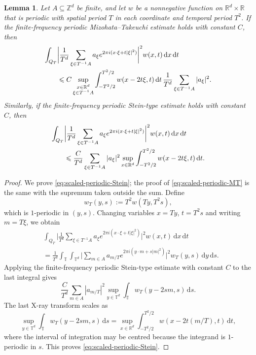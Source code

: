 \documentclass[10pt,a4paper]{amsart}
\newtheorem{lemma}[theorem]{Lemma}
\numberwithin{equation}{section}
\newcommand{\dd}{\,\mathrm{d}}
\renewcommand{\leq}{\leqslant}
\begin{document}
\begin{lemma}
Let $A\subseteq\mathbb{Z}^d$ be finite, and let $w$ be a nonnegative function on $\mathbb{R}^d\times\mathbb{R}$ that is periodic with spatial period $T$ in each coordinate and temporal period $T^2$. If the finite-frequency periodic Mizohata--Takeuchi estimate holds with constant $C$, then
\begin{align}\label{eq:scaled-periodic-MT}
\int_{Q_T}&\bigg|\frac{1}{T^d}\sum_{\xi\in T^{-1}A}a_\xi e^{2\pi i(x\cdot\xi+t|\xi|^2)}\bigg|^2w(x,t)\dd x\dd t\notag\\
&\leq C\sup_{\substack{x\in\mathbb{R}^d\\ \xi\in T^{-1}A}}\int_{-T^2/2}^{T^2/2}w(x-2t\xi,t)\dd t\,\frac{1}{T^d}\sum_{\xi\in T^{-1}A}|a_\xi|^2.
\end{align}
Similarly, if the finite-frequency periodic Stein-type estimate holds with constant $C$, then
\begin{align}\label{eq:scaled-periodic-Stein}
\int_{Q_T}&\bigg|\frac{1}{T^d}\sum_{\xi\in T^{-1}A}a_\xi e^{2\pi i(x\cdot\xi+t|\xi|^2)}\bigg|^2w(x,t)\dd x\dd t\notag\\
&\leq \frac{C}{T^d}\sum_{\xi\in T^{-1}A}|a_\xi|^2\sup_{x\in\mathbb{R}^d}\int_{-T^2/2}^{T^2/2}w(x-2t\xi,t)\dd t.
\end{align}
\end{lemma}

\begin{proof}
We prove \eqref{eq:scaled-periodic-Stein}; the proof of \eqref{eq:scaled-periodic-MT} is the same with the supremum taken outside the sum. Define
\[ w_T(y,s):=T^2w(Ty,T^2s), \]
which is $1$-periodic in $(y,s)$. Changing variables $x=Ty$, $t=T^2s$ and writing $m=T\xi$, we obtain
\begin{align*}
& \int_{Q_T} \bigg|\frac{1}{T^d}\sum_{\xi\in T^{-1}A}a_\xi e^{2\pi i(x\cdot\xi+t|\xi|^2)}\bigg|^2 w(x,t)\dd x\dd t\\
& = \frac{1}{T^d} \int_{\mathbb{T}}\int_{\mathbb{T}^d} \bigg|\sum_{m\in A}a_{m/T}e^{2\pi i(y\cdot m+s|m|^2)}\bigg|^2 w_T(y,s)\dd y\dd s.
\end{align*}
Applying the finite-frequency periodic Stein-type estimate with constant $C$ to the last integral gives
\[ \frac{C}{T^d}\sum_{m\in A}|a_{m/T}|^2\sup_{y\in\mathbb{T}^d}\int_{\mathbb{T}}w_T(y-2sm,s)\dd s. \]
The last X-ray transform scales as
\[ \sup_{y\in\mathbb{T}^d}\int_{\mathbb{T}}w_T(y-2sm,s)\dd s
=\sup_{x\in\mathbb{R}^d}\int_{-T^2/2}^{T^2/2}w(x-2t(m/T),t)\dd t, \]
where the interval of integration may be centred because the integrand is $1$-periodic in $s$. This proves \eqref{eq:scaled-periodic-Stein}.
\end{proof}
\end{document}
